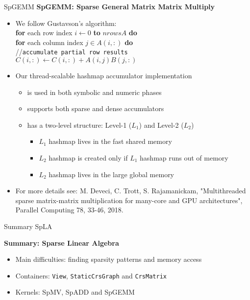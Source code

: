 \begin{frame}[fragile]{SpGEMM}
\textbf{SpGEMM: Sparse General Matrix Matrix Multiply}

\begin{itemize}
  \item We follow Gustavson's algorithm: \\
   \hspace{0.4cm}   \textbf{for} each row index $i\gets 0$  \textbf{to} $nrowsA$ \textbf{do} \\
   \hspace{0.8cm} 	   \textbf{for} each column index $j\in A(i,:)$ \textbf{do} \\
   \hspace{1.2cm}	     	//\texttt{accumulate partial row results}\\
   \hspace{1.2cm}	     	$C(i,:) \gets C(i,:) + A(i,j)B(j,:)$
  \item Our thread-scalable hashmap accumulator implementation
  \begin{itemize} 
    	\item is used in both symbolic and numeric phases
  	\item supports both sparse and dense accumulators
	\item has a two-level structure: Level-1 ($L_1$) and Level-2 ($L_2$)
	\begin{itemize}
	  \item $L_1$ hashmap lives in the fast shared memory
	  \item $L_2$ hashmap is created only if $L_1$ hashmap runs out of memory
	  \item $L_2$ hashmap lives in the large global memory 
	\end{itemize}
  \end{itemize}
  \item For more details see: {\footnotesize M. Deveci, C. Trott, S. Rajamanickam, "Multithreaded sparse matrix-matrix multiplication for many-core and GPU architectures", Parallel Computing 78, 33-46, 2018.}
 \end{itemize}  
\end{frame}

\begin{frame}[fragile]{Summary SpLA}

  \textbf{Summary: Sparse Linear Algebra}
  \begin{itemize}
    \item {Main difficulties: finding sparsity patterns and memory access}
    \item {Containers: \texttt{View}, \texttt{StaticCrsGraph} and \texttt{CrsMatrix}}
    \item {Kernels: SpMV, SpADD and SpGEMM}
  \end{itemize}

\end{frame}
